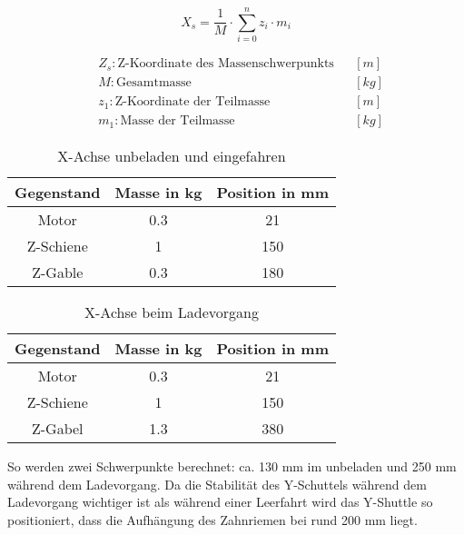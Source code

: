 \noindent\begin{minipage}{\textwidth}
\begin{minipage}[t]{0.5\textwidth}
    \vspace{7mm}
    \begin{equation*}
        X_s = \frac{1}{M} \cdot \displaystyle\sum_{i = 0}^{n} z_i \cdot m_i
    \end{equation*}
\end{minipage}%
\begin{minipage}[t]{0.5\textwidth}
    \begin{align*}
        &Z_s: \text{Z-Koordinate des Massenschwerpunkts} & &\left[m\right]\\
        &M: \text{Gesamtmasse} & &\left[kg\right]\\
        &z_1: \text{Z-Koordinate der Teilmasse} & &\left[m\right] \\
        &m_1: \text{Masse der Teilmasse} & &\left[kg\right]
    \end{align*}
\end{minipage}
\end{minipage} 
\vspace{5mm}

    \begin{table}[h!]
        \centering
        \centering
            \begin{tabular}{c c c}
                Gegenstand & Masse in kg & Position in mm\\
                \hline
                Motor & 0.3 & 21 \\
                Z-Schiene & 1 & 150 \\
                Z-Gable & 0.3 & 180 
            \end{tabular}
        \caption{X-Achse unbeladen und eingefahren}
        \end{table}
    \begin{table}[h!]
            \centering
            \begin{tabular}{c c c}
                Gegenstand & Masse in kg & Position in mm\\ 
                \hline
                Motor & 0.3 & 21 \\
                Z-Schiene & 1 & 150 \\
                Z-Gabel & 1.3 & 380
            \end{tabular}
            \caption{X-Achse beim Ladevorgang}
        \end{table}

        \vspace{5mm}
        So werden zwei Schwerpunkte berechnet: ca. 130 mm im unbeladen und 250 mm während dem Ladevorgang. Da die Stabilität des Y-Schuttels während dem Ladevorgang wichtiger ist als während einer Leerfahrt wird das Y-Shuttle so positioniert, dass die Aufhängung des Zahnriemen bei rund 200 mm liegt. 
    

